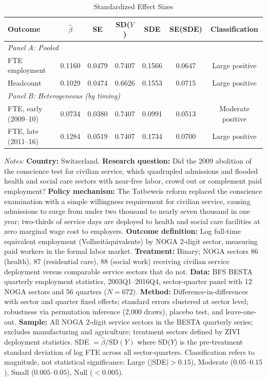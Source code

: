 \begin{table}[htbp]
\centering
\caption{Standardized Effect Sizes}
\label{tab:sde}
\begin{threeparttable}
\begin{tabular}{lcccccc}
\toprule
Outcome & $\hat{\beta}$ & SE & SD($Y$) & SDE & SE(SDE) & Classification \\
\midrule
\multicolumn{7}{l}{\textit{Panel A: Pooled}} \\
FTE employment & 0.1160 & 0.0479 & 0.7407 & 0.1566 & 0.0647 & Large positive \\
Headcount & 0.1029 & 0.0474 & 0.6626 & 0.1553 & 0.0715 & Large positive \\
\midrule
\multicolumn{7}{l}{\textit{Panel B: Heterogeneous (by timing)}} \\
FTE, early (2009--10) & 0.0734 & 0.0380 & 0.7407 & 0.0991 & 0.0513 & Moderate positive \\
FTE, late (2011--16) & 0.1284 & 0.0519 & 0.7407 & 0.1734 & 0.0700 & Large positive \\
\bottomrule
\end{tabular}
\begin{tablenotes}[flushleft]\small
\item \textit{Notes:} \textbf{Country:} Switzerland. \textbf{Research question:} Did the 2009 abolition of the conscience test for civilian service, which quadrupled admissions and flooded health and social care sectors with near-free labor, crowd out or complement paid employment? \textbf{Policy mechanism:} The Tatbeweis reform replaced the conscience examination with a simple willingness requirement for civilian service, causing admissions to surge from under two thousand to nearly seven thousand in one year; two-thirds of service days are deployed to health and social care facilities at zero marginal wage cost to employers. \textbf{Outcome definition:} Log full-time equivalent employment (Vollzeit\"aquivalente) by NOGA 2-digit sector, measuring paid workers in the formal labor market. \textbf{Treatment:} Binary; NOGA sectors 86 (health), 87 (residential care), 88 (social work) receiving civilian service deployment versus comparable service sectors that do not. \textbf{Data:} BFS BESTA quarterly employment statistics, 2003Q1--2016Q4, sector-quarter panel with 12 NOGA sectors and 56 quarters ($N=672$). \textbf{Method:} Difference-in-differences with sector and quarter fixed effects; standard errors clustered at sector level; robustness via permutation inference (2,000 draws), placebo test, and leave-one-out. \textbf{Sample:} All NOGA 2-digit service sectors in the BESTA quarterly series; excludes manufacturing and agriculture; treatment sectors defined by ZIVI deployment statistics. SDE $= \hat{\beta} / \text{SD}(Y)$ where SD($Y$) is the pre-treatment standard deviation of log FTE across all sector-quarters. Classification refers to magnitude, not statistical significance: Large ($|$SDE$| > 0.15$), Moderate ($0.05$--$0.15$), Small ($0.005$--$0.05$), Null ($< 0.005$).
\end{tablenotes}
\end{threeparttable}
\end{table}
